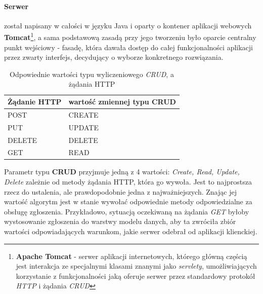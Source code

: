 		\paragraph{Serwer} został napisany w całości w języku Java i oparty o kontener aplikacji webowych 
			\textbf{Tomcat}\footnote{
				\textbf{Apache Tomcat} - serwer aplikacji internetowych, którego główną częścią jest interakcja
				ze specjalnymi klasami znanymi jako \textit{servlety}, umożliwiających korzystanie z funkcjonalności
				jaką oferuje serwer przez standardowy protokół \textit{HTTP} i żądania \textit{CRUD}		
			}, a sama podstawową zasadą przy jego tworzeniu było oparcie centralny punkt wejściowy - fasadę, która dawała
			dostęp do całej funkcjonalności aplikacji przez zwarty interfejs, decydujący o wyborze konkretnego rozwiązania.
			\begin{table}[H]
				\begin{tabular}[c]{|l|l|}
					\hline
					\textbf{Żądanie HTTP}	& 	\textbf{wartość zmiennej typu CRUD}	\\
					\hline
					POST					&	CREATE						\\
					\hline
					PUT						& 	UPDATE						\\
					\hline
					DELETE					&	DELETE						\\
					\hline
					GET						& 	READ						\\
					\hline
				\end{tabular}
				\label{c6:tab:CRUD_matches}
				\caption[Żądania HTTP a typ wyliczeniowy CRUD]{Odpowiednie wartości typu wyliczeniowego \textit{CRUD}, a żądania HTTP}
			\end{table}
			Parametr typu \textbf{CRUD} przyjmuje jedną z 4 wartości:
			\textit{Create, Read, Update, Delete} zależnie od metody żądania HTTP, która go wywoła. Jest to najprostsza rzecz
			do ustalenia, ale prawdopodobnie jedna z najważniejszych. Znając jej wartość algorytm jest w stanie wywołać
			odpowiednie metody odpowiedzialne za obsługę zgłoszenia. Przykładowo, sytuacją oczekiwaną na żądania 
			\textit{GET} byłoby wystosowanie zgłoszenia do warstwy modelu danych, aby ta zwróciła zbiór wartości odpowiadających
			warunkom, jakie serwer odebrał od aplikacji klienckiej. 
